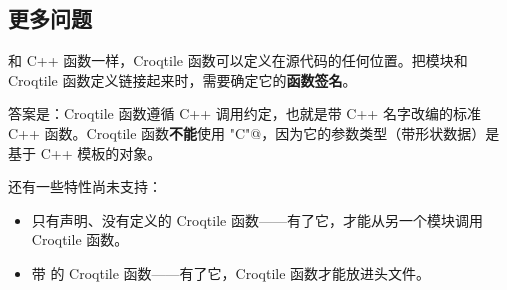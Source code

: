\subsection*{更多问题}

和 C++ 函数一样，Croqtile 函数可以定义在源代码的任何位置。把模块和 Croqtile 函数定义链接起来时，需要确定它的\textbf{函数签名}。

答案是：Croqtile 函数遵循 C++ 调用约定，也就是带 C++ 名字改编的标准 C++ 函数。Croqtile 函数\textbf{不能}使用 \co@extern "C"@，因为它的参数类型（带形状数据）是基于 C++ 模板的对象。

还有一些特性尚未支持：

\begin{itemize}[leftmargin=1.6em]
\item 只有声明、没有定义的 Croqtile 函数——有了它，才能从另一个模块调用 Croqtile 函数。
\item 带 \co@inline@ 的 Croqtile 函数——有了它，Croqtile 函数才能放进头文件。
\end{itemize}

